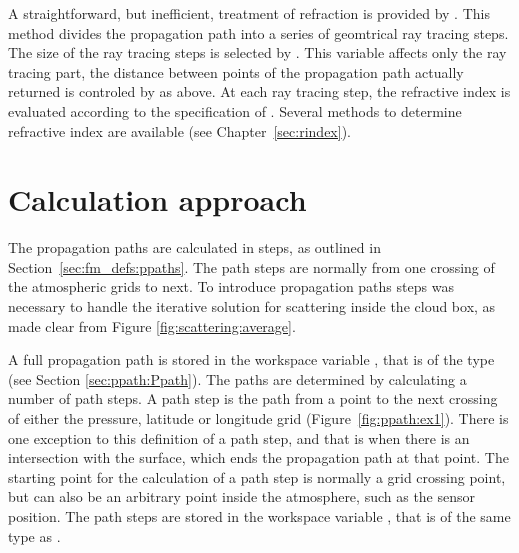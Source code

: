 A straightforward, but inefficient, treatment of refraction is provided by
. This method divides the propagation path
into a series of geomtrical ray tracing steps. The size of the ray tracing
steps is selected by . This variable affects only
the ray tracing part, the distance between points of the propagation path
actually returned is controled by  as above.
At each ray tracing step, the refractive index is evaluated according to the 
specification of . Several methods to determine 
refractive index are available (see Chapter~\ref{sec:rindex}).



\section{Calculation approach}
\label{sec:ppath:approach}

The propagation paths are calculated in steps, as outlined in
Section~\ref{sec:fm_defs:ppaths}. The path steps are normally from one crossing
of the atmospheric grids to next. To introduce
propagation paths steps was necessary to handle the iterative solution for
scattering inside the cloud box, as made clear from Figure
\ref{fig:scattering:average}.

A full propagation path is stored in the workspace variable ,
that is of the type  (see Section \ref{sec:ppath:Ppath}). The
paths are determined by calculating a number of path steps. A path step is the
path from a point to the next crossing of either the pressure, latitude or
longitude grid (Figure~\ref{fig:ppath:ex1}). There is one exception to this
definition of a path step, and that is when there is an intersection with the
surface, which ends the propagation path at that point. The starting point for
the calculation of a path step is normally a grid crossing point, but can also
be an arbitrary point inside the atmosphere, such as the sensor position. The
path steps are stored in the workspace variable , that is
of the same type as .

